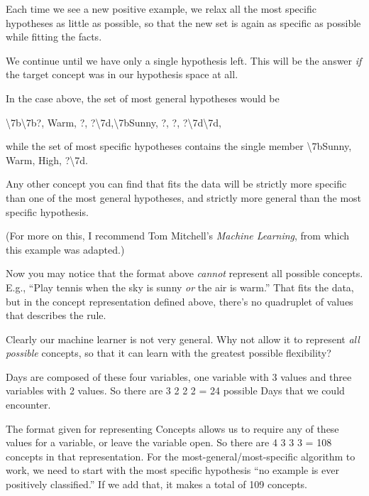 {
 Each time we see a new positive example, we relax all the most
specific hypotheses as little as possible, so that the new set is again
as specific as possible while fitting the facts.}

{
 We continue until we have only a single hypothesis left. This will
be the answer \textit{if} the target concept was in our hypothesis
space at all.}

{
 In the case above, the set of most general hypotheses would be}

{\centering
 {\textbackslash}{\textquotesingle}7b{\textbackslash}{\textquotesingle}7b?,
Warm, ?,
?{\textbackslash}{\textquotesingle}7d,{\textbackslash}{\textquotesingle}7bSunny,
?, ?,
?{\textbackslash}{\textquotesingle}7d{\textbackslash}{\textquotesingle}7d,
\par}


\bigskip

{
 while the set of most specific hypotheses contains the single
member {\textbackslash}{\textquotesingle}7bSunny, Warm, High,
?{\textbackslash}{\textquotesingle}7d. }

{
 Any other concept you can find that fits the data will be strictly
more specific than one of the most general hypotheses, and strictly
more general than the most specific hypothesis.}

{
 (For more on this, I recommend Tom Mitchell's
\textit{Machine Learning}, from which this example was
adapted.)}

{
 Now you may notice that the format above \textit{cannot} represent
all possible concepts. E.g., ``Play tennis when the
sky is sunny \textit{or} the air is warm.'' That fits
the data, but in the concept representation defined above,
there's no quadruplet of values that describes the
rule.}

{
 Clearly our machine learner is not very general. Why not allow it
to represent \textit{all possible} concepts, so that it can learn with
the greatest possible flexibility?}

{
 Days are composed of these four variables, one variable with 3
values and three variables with 2 values. So there are 3 {\texttimes} 2
{\texttimes} 2 {\texttimes} 2 = 24 possible Days that we could
encounter.}

{
 The format given for representing Concepts allows us to require
any of these values for a variable, or leave the variable open. So
there are 4 {\texttimes} 3 {\texttimes} 3 {\texttimes} 3 = 108 concepts
in that representation. For the most-general/most-specific algorithm to
work, we need to start with the most specific hypothesis
``no example is ever positively
classified.'' If we add that, it makes a total of 109
concepts.}

